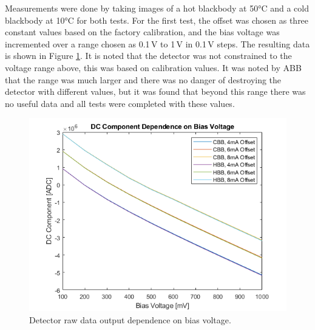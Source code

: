 Measurements were done by taking images of a hot blackbody at 50°C and a cold blackbody at 10°C for both tests. For the first test, the offset was chosen as three constant values based on the factory calibration, and the bias voltage was incremented over a range chosen as 0.1\,V to 1\,V in 0.1\,V steps. The resulting data is shown in Figure \ref{fig:dc_dep_on_bias}. It is noted that the detector was not constrained to the voltage range above, this was based on calibration values. It was noted by ABB that the range was much larger and there was no danger of destroying the detector with different values, but it was found that beyond this range there was no useful data and all tests were completed with these values.

\begin{figure}[h]
  \centering
  \includegraphics[width=0.9\linewidth]{chap6_images/verification/dc_component_dependence_on_bias_voltage.png}
  \caption{Detector raw data output dependence on bias voltage.}
  \label{fig:dc_dep_on_bias}
\end{figure}

